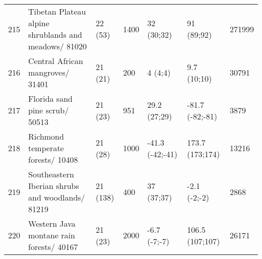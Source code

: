 \begin{table}[ht]
\begin{tabular}{rllllll}
  215 & Tibetan Plateau alpine shrublands and meadows/ 81020 & 22 (53) & 1400 & 32 (30;32) & 91 (89;92) & 271999 \\ 
  216 & Central African mangroves/ 31401 & 21 (21) & 200 & 4 (4;4) & 9.7 (10;10) & 30791 \\ 
  217 & Florida sand pine scrub/ 50513 & 21 (23) & 951 & 29.2 (27;29) & -81.7 (-82;-81) & 3879 \\ 
  218 & Richmond temperate forests/ 10408 & 21 (28) & 1000 & -41.3 (-42;-41) & 173.7 (173;174) & 13216 \\ 
  219 & Southeastern Iberian shrubs and woodlands/ 81219 & 21 (138) & 400 & 37 (37;37) & -2.1 (-2;-2) & 2868 \\ 
  220 & Western Java montane rain forests/ 40167 & 21 (23) & 2000 & -6.7 (-7;-7) & 106.5 (107;107) & 26171 \\ 
   \hline
\end{tabular}
\end{table}
